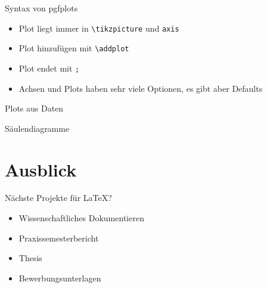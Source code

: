 \documentclass[presentation,aspectratio=169]{beamer}
\begin{document}
\begin{frame}[fragile]{Syntax von pgfplots}
  \begin{itemize}
    \item Plot liegt immer in \verb|\tikzpicture| und \verb|axis|
    \item Plot hinzufügen mit \verb|\addplot|
    \item Plot endet mit \verb|;|
    \item Achsen und Plots haben sehr viele Optionen, es gibt aber Defaults
  \end{itemize}
\end{frame}

\begin{frame}{Plots aus Daten}
\end{frame}

\begin{frame}{Säulendiagramme}
\end{frame}

\section{Ausblick}

\begin{frame}{Nächste Projekte für \LaTeX{}?}
  \begin{itemize}
    \item Wissenschaftliches Dokumentieren
    \item Praxissemesterbericht
    \item Thesis
    \bigskip
    \item Bewerbungsunterlagen
  \end{itemize}
\end{frame}
\end{document}
